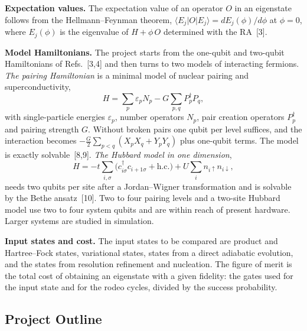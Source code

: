 \documentclass[12pt,a4paper]{article}
\begin{document}
\textbf{Expectation values.}  The expectation value of an operator $O$
in an eigenstate follows from the Hellmann--Feynman theorem,
$\langle E_j|O|E_j\rangle=dE_j(\phi)/d\phi$ at $\phi=0$, where
$E_j(\phi)$ is the eigenvalue of $H+\phi\,O$ determined with the
RA~[3].

\textbf{Model Hamiltonians.}  The project starts from the one-qubit
and two-qubit Hamiltonians of Refs.~[3,4] and then turns to two models
of interacting fermions.  \emph{The pairing Hamiltonian} is a minimal
model of nuclear pairing and superconductivity,
\[
  H=\sum_{p}\varepsilon_p N_p-G\sum_{p,q}P_p^\dagger P_q ,
\]
with single-particle energies $\varepsilon_p$, number operators $N_p$,
pair creation operators $P_p^\dagger$ and pairing strength $G$.
Without broken pairs one qubit per level suffices, and the interaction
becomes $-\tfrac{G}{2}\sum_{p<q}(X_pX_q+Y_pY_q)$ plus one-qubit terms.
The model is exactly solvable~[8,9].  \emph{The Hubbard model in one
dimension},
\[
  H=-t\sum_{i,\sigma}\bigl(c^\dagger_{i\sigma}c_{i+1\sigma}+\mathrm{h.c.}\bigr)
  +U\sum_i n_{i\uparrow}n_{i\downarrow},
\]
needs two qubits per site after a Jordan--Wigner transformation and
is solvable by the Bethe ansatz~[10].  Two to four pairing levels and
a two-site Hubbard model use two to four system qubits and are within
reach of present hardware.  Larger systems are studied in simulation.

\textbf{Input states and cost.}  The input states to be compared are
product and Hartree--Fock states, variational states, states from a
direct adiabatic evolution, and the states from resolution refinement
and nucleation.  The figure of merit is the total cost of obtaining an
eigenstate with a given fidelity: the gates used for the input state
and for the rodeo cycles, divided by the success probability.

\subsection*{Project Outline}
\end{document}
